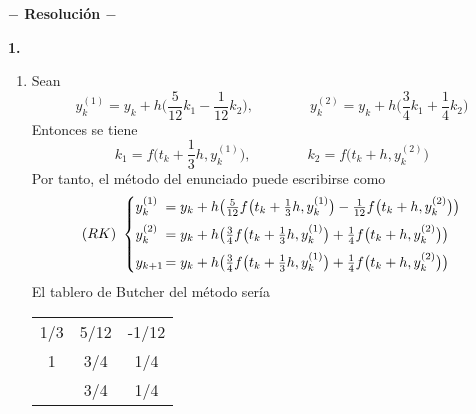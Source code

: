 \documentclass[11pt]{report}
\begin{document}




\begin{center}

	\textbf{$-$ Resolución $-$}

\end{center}


\textbf{1.} 

\begin{enumerate}
    \item Sean
\[\textstyle y_k^{(1)} = y_k+h\bigl(\frac{5}{12}k_1-\frac{1}{12}k_2\bigr), \qquad \qquad y_k^{(2)} = y_k+h\bigl(\frac{3}{4}k_1+\frac{1}{4}k_2\bigr)\]
Entonces se tiene
\[\textstyle k_1 = f\bigl(t_k+\frac{1}{3}h,y_k^{(1)}\bigr), \qquad \qquad k_2 = f\bigl(t_k+h,y_k^{(2)}\bigr)\]
Por tanto, el método del enunciado puede escribirse como 
\[(RK) \ \begin{cases}
    y_k^{(1)}  &\hspace{-3mm}= y_k+h\bigl(\frac{5}{12}f\bigl(t_k+\frac{1}{3}h,y_k^{(1)}\bigr)-\frac{1}{12}f\bigl(t_k+h,y_k^{(2)}\bigr)\bigr)  \\[5pt]
    y_k^{(2)} &\hspace{-3mm}= y_k+h\bigl(\frac{3}{4}f\bigl(t_k+\frac{1}{3}h,y_k^{(1)}\bigr)+\frac{1}{4}f\bigl(t_k+h,y_k^{(2)}\bigr)\bigr) \\[5pt]
    y_{k+1} &\hspace{-3mm}= y_k+h\bigl(\frac{3}{4}f\bigl(t_k+\frac{1}{3}h,y_k^{(1)}\bigr)+\frac{1}{4}f\bigl(t_k+h,y_k^{(2)}\bigr)\bigr)
\end{cases}\]
El tablero de Butcher del método sería

\begin{center}
    \setlength\extrarowheight{2.5pt}
    \begin{tabular}{c|cc}
        1/3 & 5/12 & -1/12 \\
        1 & 3/4  & \phantom{-}1/4 \\ \hline
        & 3/4 & \phantom{-}1/4
    \end{tabular}
\end{center}


\end{enumerate}
\end{document}
